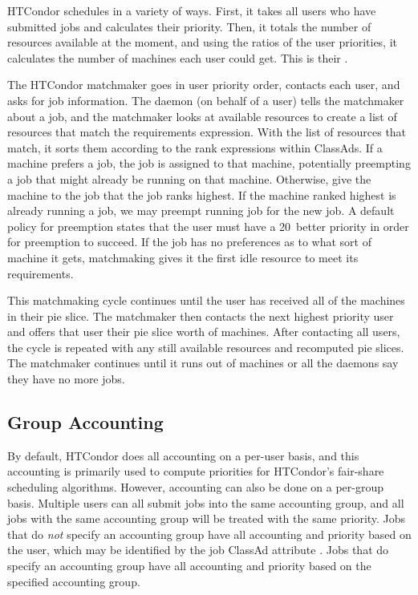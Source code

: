 HTCondor schedules in a variety of ways.
First, it takes all users who have submitted jobs and calculates their priority.
Then, it totals the number of resources available at the moment,
and using the ratios of the user priorities,
it calculates the number of machines each user could get.
This is their .

The HTCondor matchmaker goes in user priority order, 
contacts each user, and asks for job information. 
The  daemon (on behalf of a user)
tells the matchmaker about a job,
and the matchmaker looks at available resources
to create a list of resources that match the requirements expression.
With the list of resources that match,
it sorts them according to the rank expressions within ClassAds.
If a machine prefers a job, the job is assigned to that machine,
potentially preempting a job that might already be running on that machine.
Otherwise, give the machine to the job that the job ranks highest.
If the machine ranked highest is already running a job,
we may preempt running job
for the new job. 
A default policy for preemption states that the user must
have a 20\Percent\  better priority in order for preemption to succeed.
If the job has no preferences as to what sort of machine it gets,
matchmaking gives it the first idle resource to meet its requirements.

This matchmaking cycle continues until the user has received all of the
machines in their pie slice.
The matchmaker then contacts the next highest
priority user and offers that user their pie slice worth of machines.
After contacting all users,
the cycle is repeated with any still available resources
and recomputed pie slices.
The matchmaker continues  
until it runs out of machines or all the  daemons
say they have no more jobs. 

\subsection{\label{sec:group-accounting}Group Accounting}

By default, HTCondor does all accounting on a per-user basis, and this
accounting is primarily used to compute priorities for HTCondor's
fair-share scheduling algorithms. 
However, accounting can also be done on a per-group basis.
Multiple users can all submit jobs into the same accounting group,
and all jobs with the same accounting group
will be treated with the same priority.
Jobs that do \emph{not} specify an accounting group have 
all accounting and priority based on the user, 
which may be identified by the job ClassAd attribute .
Jobs that do specify an accounting group have 
all accounting and priority based on the specified accounting group.

